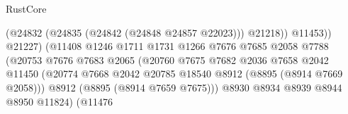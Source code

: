 \begin{lexlean}{RustCore}
\begin{coremodule}
                                                          (@24832
                                                            (@24835 (@24842 (@24848 @24857 @22023)))
                                                            @21218))
                                                        @11453))
                                                    @21227)
                                                  (@11408
                                                    @1246
                                                    @1711
                                                    @1731
                                                    @1266
                                                    @7676
                                                    @7685
                                                    @2058
                                                    @7788
                                                    (@20753
                                                      @7676
                                                      @7683
                                                      @2065
                                                      (@20760
                                                        @7675
                                                        @7682
                                                        @2036
                                                        @7658
                                                        @2042
                                                        @11450
                                                        (@20774
                                                          @7668
                                                          @2042
                                                          @20785
                                                          @18540
                                                          @8912
                                                          (@8895 (@8914 @7669 @2058)))
                                                        @8912
                                                        (@8895 (@8914 @7659 @7675)))
                                                      @8930
                                                      @8934
                                                      @8939
                                                      @8944
                                                      @8950
                                                      @11824)
                                                    (@11476

\end{coremodule}
\end{lexlean}
